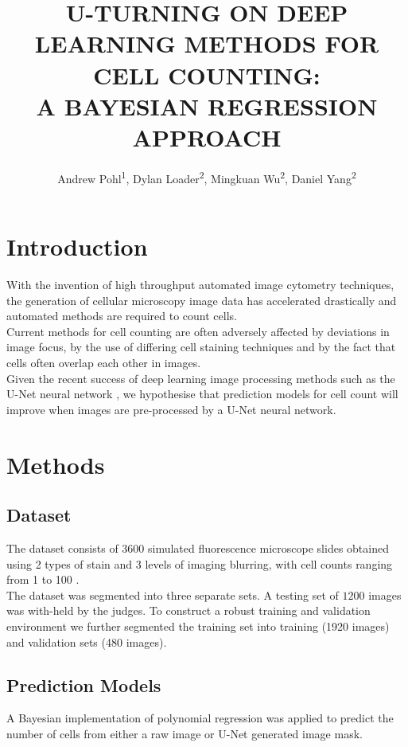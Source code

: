 \documentclass[isoft]{poster_class_UofC}
\title{\uppercase{U-turning on Deep Learning Methods for Cell Counting:\\ A Bayesian Regression Approach}}
\author{Andrew Pohl\textsuperscript{1}, Dylan Loader\textsuperscript{2}, Mingkuan Wu\textsuperscript{2}, Daniel Yang\textsuperscript{2}}
\begin{document}
    \begin{poster}
    
    \section{Introduction}
With the invention of high throughput automated image cytometry techniques, the generation of cellular microscopy image data has accelerated drastically and automated methods are required to count cells.  \\

 Current methods for cell counting are often adversely affected by deviations in image focus, by the use of differing cell staining techniques and by the fact that cells often overlap each other in images. \\

 Given the recent success of deep learning image processing methods such as the U-Net neural network \cite{FalkThorsten2019Udlf}, we hypothesise that prediction models for cell count will improve when images are pre-processed by a U-Net neural network.


        
    \section{Methods}%
        
        \subsection{Dataset}
 The dataset consists of 3600 simulated fluorescence microscope slides obtained using 2 types of stain and 3 levels of imaging blurring, with cell counts ranging from 1 to 100 \cite{VebjornLjosa2012Ahmi}.\\

 The dataset was segmented into three separate sets.  A testing set of $1200$ images was with-held by the judges.  To construct a robust training and validation environment we further segmented the training set into training (1920 images) and validation sets (480 images).

             \subsection{Prediction Models}    
  A Bayesian implementation of polynomial regression was applied to predict the number of cells from either a raw image or U-Net generated image mask.  \\


\end{poster}
\end{document}
